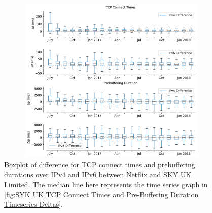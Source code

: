 \begin{figure}[!ht]
	\centering
	\includegraphics[keepaspectratio, height=8cm, width=15cm]{figures/cache/bskyb/netflix-tcp-pd-delay-boxplot-asn-5607.pdf}
	\caption[SKY UK TCP Connect Times and Pre-Buffering Duration Boxplot Deltas]{Boxplot of difference for TCP connect times and prebuffering durations over IPv4 and IPv6 between Netflix and SKY UK Limited.
	The median line here represents the time series graph in \cref{fig:SYK UK TCP Connect Times and Pre-Buffering Duration Timeseries Deltas}.}
	\label{fig:SKY UK TCP Connect Times and Pre-Buffering Duration Boxplot Deltas}
\end{figure}

